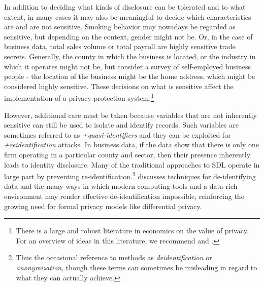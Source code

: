 \documentclass[
]{book}
\begin{document}
In addition to deciding what kinds of disclosure can be tolerated and to what extent, in many cases it may also be meaningful to decide which characteristics are and are not sensitive. Smoking behavior may nowadays be regarded as sensitive, but depending on the context, gender might not be. Or, in the case of business data, total sales volume or total payroll are highly sensitive trade secrets. Generally, the county in which the business is located, or the industry in which it operates might not be, but consider a survey of self-employed business people - the location of the business might be the home address, which might be considered highly sensitive. These decisions on what is sensitive affect the implementation of a privacy protection system.\footnote{There is a large and robust literature in economics on the value of privacy. For an overview of ideas in this literature, we recommend \citet{varian_economic_2002} and \citet{acquisti_economics_2016}.}

However, additional care must be taken because variables that are not inherently sensitive can still be used to isolate and identify records. Such variables are sometimes referred to as \emph{+quasi-identifiers\textbar{}} and they can be exploited for \emph{+reidentification\textbar{}} attacks. In business data, if the data show that there is only one firm operating in a particular county and sector, then their presence inherently leads to identity disclosure. Many of the traditional approaches to SDL operate in large part by preventing re-identification.\footnote{Thus the occasional reference to methods as \emph{deidentification} or \emph{anonymization}, though these terms can sometimes be misleading in regard to what they can actually achieve.} \citet{garfinkel_-identification_2015} discusses techniques for de-identifying data and the many ways in which modern computing tools and a data-rich environment may render effective de-identification impossible, reinforcing the growing need for formal privacy models like differential privacy.
\end{document}
